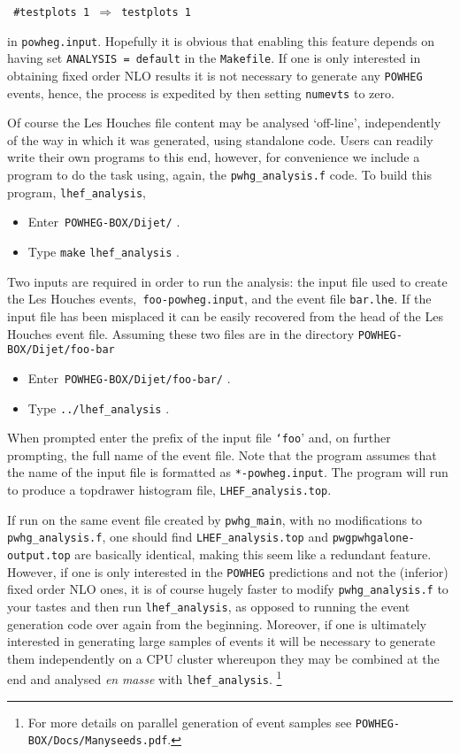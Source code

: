 \documentclass[paper]{JHEP3}
\newcommand\POWHEG{{\tt POWHEG}}
\begin{document}
\begin{center}
\texttt{\medskip{}
\#testplots 1 $\Rightarrow$ testplots 1\medskip{}
}
\par\end{center}

\noindent in \texttt{powheg.input}. Hopefully it is obvious that enabling
this feature depends on having set \texttt{ANALYSIS = default} in
the \texttt{Makefile}. If one is only interested in obtaining fixed
order NLO results it is not necessary to generate any \POWHEG{}
events, hence, the process is expedited by then setting \texttt{numevts}
to zero.

Of course the Les Houches file content may be analysed `off-line',
independently of the way in which it was generated, using standalone
code. Users can readily write their own programs to this end, however,
for convenience we include a program to do the task using, again,
the \texttt{pwhg\_analysis.f} code. To build this program, \texttt{lhef\_analysis},
\begin{itemize}
\item Enter\texttt{ POWHEG-BOX/Dijet/} .
\item Type \texttt{make} \texttt{lhef\_analysis} .
\end{itemize}
\noindent Two inputs are required in order to run the analysis: the
input file used to create the Les Houches events,\texttt{ foo-powheg.input},
and the event file \texttt{bar.lhe}. If the input file has been misplaced
it can be easily recovered from the head of the Les Houches event
file. Assuming these two files are in the directory \texttt{POWHEG-BOX/Dijet/foo-bar}
\begin{itemize}
\item Enter\texttt{ POWHEG-BOX/Dijet/foo-bar/} .
\item Type \texttt{../lhef\_analysis} .
\end{itemize}
When prompted enter the prefix of the input file \texttt{`foo}' and,
on further prompting, the full name of the event file. Note that the
program assumes that the name of the input file is formatted as \texttt{{*}-powheg.input}.
The program will run to produce a topdrawer histogram file, \texttt{LHEF\_analysis.top}.

If run on the same event file created by \texttt{pwhg\_main}, with
no modifications to \texttt{pwhg\_analysis.f}, one should find \texttt{LHEF\_analysis.top}
and \texttt{pwgpwhgalone-output.top} are basically identical, making
this seem like a redundant feature. However, if one is only interested
in the \POWHEG{} predictions and not the (inferior) fixed order
NLO ones, it is of course hugely faster to modify \texttt{pwhg\_analysis.f}
to your tastes and then run \texttt{lhef\_analysis}, as opposed to
running the event generation code over again from the beginning. Moreover,
if one is ultimately interested in generating large samples of events
it will be necessary to generate them independently on a CPU cluster
whereupon they may be combined at the end and analysed \emph{en} \emph{masse}
with \texttt{lhef\_analysis}.%
\footnote{For more details on parallel generation of event samples see \texttt{POWHEG-BOX/Docs/Manyseeds.pdf}.%
}
\end{document}
